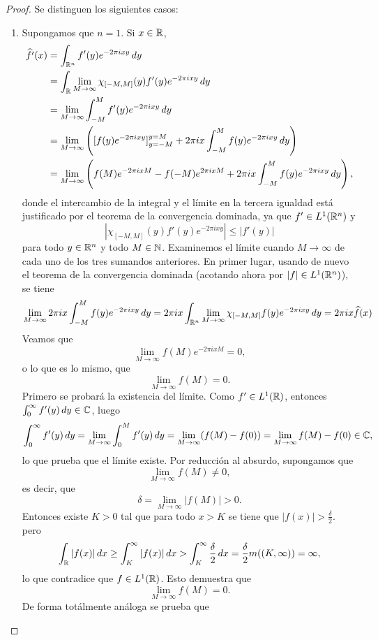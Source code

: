 \documentclass[a4paper, 11pt, oneside]{report}
\begin{document}
\begin{proof}
  Se distinguen los siguientes casos:
  \begin{enumerate}
    \item Supongamos que $n = 1$. Si $x \in \mathbb R$,
    \[\begin{aligned}[t]
      \widehat{f'}(x) &= \int_{\mathbb R^n} f'(y)e^{-2\pi i xy} \, dy \\
      &= \int_\mathbb R \lim_{M \to \infty} \chi_{[-M,M]}(y)f'(y)e^{-2\pi i xy} \, dy \\
      &= \lim_{M \to \infty} \int_{-M}^M f'(y) e^{-2\pi i xy} \, dy \\
      &= \lim_{M \to \infty} \left([f(y)e^{-2\pi i xy}]_{y=-M}^{y = M} + 2\pi i x\int_{-M}^M f(y)e^{-2\pi i xy} \, dy\right) \\
      &= \lim_{M \to \infty} \left(f(M)e^{-2\pi i xM} - f(-M)e^{2\pi i x M} + 2\pi i x \int_{-M}^Mf(y)e^{-2\pi i xy} \, dy\right),
    \end{aligned}\]
    donde el intercambio de la integral y el límite en la tercera igualdad está justificado por el teorema de la convergencia dominada, ya que $f' \in L^1(\mathbb R^n)$ y
    \[|\chi_{[-M,M]}(y)f'(y)e^{-2\pi i xy}| \leq |f'(y)|\]
    para todo $y \in \mathbb R^n$ y todo $M \in \mathbb N$. Examinemos el límite cuando $M \to \infty$ de cada uno de los tres sumandos anteriores. En primer lugar, usando de nuevo el teorema de la convergencia dominada (acotando ahora por $|f| \in L^1(\mathbb R^n)$), se tiene
    \[\lim_{M \to \infty} 2\pi i x\int_{-M}^M f(y)e^{-2\pi i xy} \, dy = 2\pi i x\int_{\mathbb R^n} \lim_{M \to \infty}\chi_{[-M,M]} f(y)e^{-2\pi i xy} \, dy = 2 \pi i x \widehat{f}(x)\]
    Veamos que
    \[\lim_{M \to \infty} f(M)e^{-2\pi i x M} = 0,\]
    o lo que es lo mismo, que
    \[\lim_{M \to \infty} f(M)= 0.\]
    Primero se probará la existencia del límite. Como $f' \in L^1(\mathbb R)$, entonces $\int_0^\infty f'(y) \, dy \in \mathbb C$, luego
    \[\int_0^\infty f'(y) \, dy = \lim_{M \to \infty} \int_0^M f'(y) \, dy = \lim_{M \to \infty} (f(M)-f(0)) = \lim_{M \to \infty} f(M) - f(0) \in \mathbb C,\]
    lo que prueba que el límite existe. Por reducción al absurdo, supongamos que \[\lim_{M \to \infty} f(M) \neq 0,\] es decir, que \[\delta = \lim_{M \to \infty} |f(M)| > 0.\] Entonces existe $K > 0$ tal que para todo $x > K$ se tiene que $|f(x)| > \frac{\delta}{2}$. pero
    \[\int_\mathbb R |f(x)| \, dx \geq \int_K^\infty |f(x)| \, dx > \int_K^\infty \frac{\delta}{2} \, dx = \frac{\delta}{2}m((K,\infty)) = \infty,\]
    lo que contradice que $f \in L^1(\mathbb R)$. Esto demuestra que
    \[\lim_{M \to \infty} f(M)= 0.\]
    De forma totálmente análoga se prueba que

\end{enumerate}
\end{proof}
\end{document}
